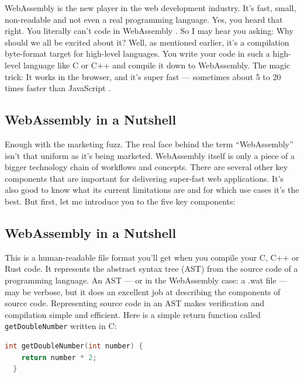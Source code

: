 \documentclass[10pt]{article}  %
\begin{document}
\begin{sloppypar}
  WebAssembly is the new player in the web development industry. It’s fast, small, non-readable and not even a real programming language. Yes, you heard that right. You literally can’t code in WebAssembly \citep{rourke_learn_2018}. So I may hear you asking: Why should we all be excited about it? Well, as mentioned earlier, it’s a compilation byte-format target for high-level languages. You write your code in such a high-level language like C or C++ and compile it down to WebAssembly. The magic trick: It works in the browser, and it’s super fast — sometimes about 5 to 20 times faster than JavaScript \citep{aboukhalil_how_2019}.

  \subsection{WebAssembly in a Nutshell}
  \label{sec:in-a-nutshell}

  Enough with the marketing fuzz. The real face behind the term “WebAssembly” isn’t that uniform as it’s being marketed. WebAssembly itself is only a piece of a bigger technology chain of workflows and concepts. There are several other key components that are important for delivering super-fast web applications. It’s also good to know what its current limitations are and for which use cases it’s the best. But first, let me introduce you to the five key components:

  \subsection{WebAssembly in a Nutshell}
  \label{sec:webassembly-text-format}

  This is a human-readable file format you’ll get when you compile your C, C++ or Rust code. It represents the abstract syntax tree (AST) from the source code of a programming language. An AST — or in the WebAssembly case: a .wat file — may be verbose, but it does an excellent job at describing the components of source code. Representing source code in an AST makes verification and compilation simple and efficient. Here is a simple return function called \lstinline{getDoubleNumber} written in C:

  \begin{lstlisting}[language=C, caption=Python example, label=lst:python-example]
  int getDoubleNumber(int number) {
    return number * 2;
  }
  \end{lstlisting}

  \pagebreak
  
  

\end{sloppypar}
\end{document}
